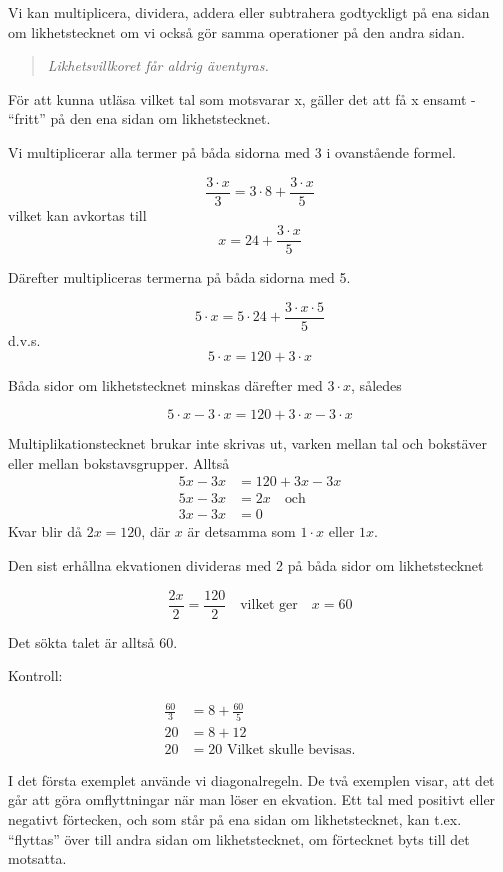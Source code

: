 Vi kan multiplicera, dividera, addera eller subtrahera godtyckligt på ena sidan
om likhetstecknet om vi också gör samma operationer på den andra sidan.

\begin{quote}\emph{
Likhetsvillkoret får aldrig äventyras.
}\end{quote}

För att kunna utläsa vilket tal som motsvarar x, gäller det att få x ensamt -
``fritt'' på den ena sidan om likhetstecknet.

Vi multiplicerar alla termer på båda sidorna med 3 i ovanstående formel.

\[\frac{3 \cdot x}{3} = 3 \cdot 8 + \frac{3 \cdot x}{5}\]
vilket kan avkortas till
\[x = 24 + \frac{3 \cdot x}{5}\]

Därefter multipliceras termerna på båda sidorna med 5.

\[5 \cdot  x = 5 \cdot 24 + \frac{3 \cdot x \cdot 5}{5}\]
d.v.s.
\[5 \cdot x = 120 + 3 \cdot x\]

Båda sidor om likhetstecknet minskas därefter med \(3 \cdot x\), således

\[5 \cdot x - 3 \cdot x = 120 + 3 \cdot x - 3 \cdot x\]

Multiplikationstecknet brukar inte skrivas ut, varken mellan tal och bokstäver
eller mellan bokstavsgrupper. Alltså
\begin{align*}
5x - 3x &= 120 + 3x - 3x \\
5x - 3x &= 2x \quad \text{och} \\
3x - 3x &= 0
\end{align*}
Kvar blir då \(2x = 120\), där \(x\) är detsamma som \(1 \cdot x\) eller \(1x\).

Den sist erhållna ekvationen divideras med 2 på båda sidor om likhetstecknet

\[
\frac{2x}{2} = \frac{120}{2}
\quad \text{vilket ger} \quad
x = 60
\]

Det sökta talet är alltså 60.

Kontroll:

\begin{align*}
\frac{60}{3} & = 8 + \frac{60}{5}\\
          20 &= 8 + 12 \\
          20 &= 20\text{ Vilket skulle bevisas.}
\end{align*}


I det första exemplet använde vi diagonalregeln. De två exemplen visar, att det
går att göra omflyttningar när man löser en ekvation. Ett tal med positivt eller
negativt förtecken, och som står på ena sidan om likhetstecknet, kan t.ex.
``flyttas'' över till andra sidan om likhetstecknet, om förtecknet byts till det
motsatta.

